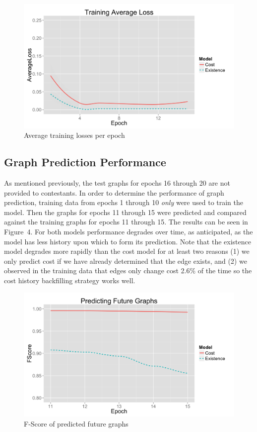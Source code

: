 \documentclass{article} %
\begin{document}
\begin{figure}
  \begin{center}
    \includegraphics[scale=.1]{trainingAverageLoss.png}
  \end{center}
  \caption{Average training losses per epoch}
\end{figure}

\subsection{Graph Prediction Performance}

As mentioned previously, the test graphs for epochs 16 through 20 are not
provided to contestants.  In order to determine the performance of graph
prediction, training data from epochs 1 through 10 \emph{only} were used to
train the model.  Then the graphs for epochs 11 through 15 were predicted
and compared against the training graphs for epochs 11 through 15.  The
results can be seen in Figure~4.  For both models performance degrades over
time, as anticipated, as the model has less history upon which to form its
prediction.  Note that the existence model degrades more rapidly than the
cost model for at least two reasons (1) we only predict cost if we have
already determined that the edge exists, and (2) we observed in the training
data that edges only change cost 2.6\% of the time so the cost history
backfilling strategy works well.

\begin{figure}
  \begin{center}
    \includegraphics[scale=.1]{predictingFutureGraphs.png}
  \end{center}
  \caption{F-Score of predicted future graphs}
\end{figure}
\end{document}
